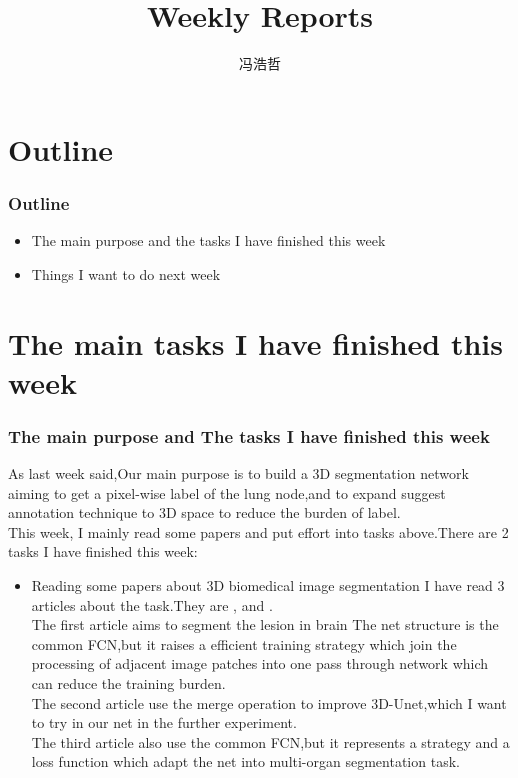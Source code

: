 \documentclass[8pt]{beamer}
\title{Weekly Reports}
\author{冯浩哲}
\begin{document}
	\frame{\titlepage}
		
	
	\section*{Outline}	

\begin{frame}[fragile]
\frametitle{Outline}
\begin{itemize}  
	
\item  The main purpose and the tasks I have finished this week
\vspace{.5cm} 
\item  Things I want to do next week
\vspace{.5cm}
\end{itemize}
\end{frame}

\section*{The main tasks I have finished this week}	
\begin{frame}[fragile]
\frametitle{The main purpose and The tasks I have finished this week}
As last week said,Our main purpose is to build a 3D segmentation network aiming to get a pixel-wise label of the lung node,and to expand suggest annotation technique to 3D space to reduce the burden of label.\\
This week, I mainly read some papers and put effort into tasks above.There are 2 tasks I have finished this week:\\
\vspace{.3cm}
\begin{itemize}
\item Reading some papers about 3D biomedical image segmentation
\vspace{.3cm}
I have read 3 articles about the task.They are \cite{DBLP:journals/corr/KamnitsasLNSKMR16},\cite{DBLP:journals/corr/KayalibayJS17} and \cite{DBLP:journals/corr/RothOHOSFMM17}.\\
\vspace{.3cm}
The first article aims to segment the lesion in brain The net structure is the common FCN,but it raises a efficient training strategy which join the processing of adjacent image patches into one pass through network which can reduce the training burden.\\
\vspace{.3cm}
The second article use the merge operation to improve 3D-Unet,which I want to try in our net in the further experiment.\\
\vspace{.3cm}
The third article also use the common FCN,but it represents a strategy and a loss function which adapt the net into multi-organ segmentation task.
\vspace{.3cm}
\end{itemize}
\end{frame}	
\end{document}
